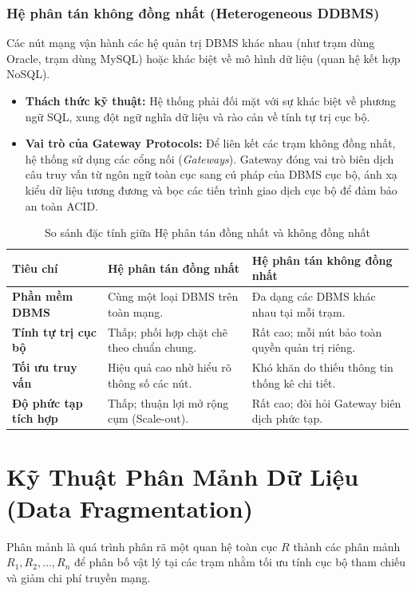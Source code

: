 \documentclass[12pt,a4paper]{report}
\begin{document}
\subsubsection{Hệ phân tán không đồng nhất (Heterogeneous DDBMS)}
Các nút mạng vận hành các hệ quản trị DBMS khác nhau (như trạm dùng Oracle, trạm dùng MySQL) hoặc khác biệt về mô hình dữ liệu (quan hệ kết hợp NoSQL).
\begin{itemize}[leftmargin=0.8cm, topsep=2pt, itemsep=1pt]
    \item \textbf{Thách thức kỹ thuật:} Hệ thống phải đối mặt với sự khác biệt về phương ngữ SQL, xung đột ngữ nghĩa dữ liệu và rào cản về tính tự trị cục bộ.
    \item \textbf{Vai trò của Gateway Protocols:} Để liên kết các trạm không đồng nhất, hệ thống sử dụng các cổng nối (\textit{Gateways}). Gateway đóng vai trò biên dịch câu truy vấn từ ngôn ngữ toàn cục sang cú pháp của DBMS cục bộ, ánh xạ kiểu dữ liệu tương đương và bọc các tiến trình giao dịch cục bộ để đảm bảo an toàn ACID.
\end{itemize}

\vspace{0.2cm}
\begin{table}[!ht]
\centering
\small
\caption{So sánh đặc tính giữa Hệ phân tán đồng nhất và không đồng nhất}
\label{tab:so_sanh_dong_nhat_khong_dong_nhat}
\renewcommand{\arraystretch}{1.25}
\begin{tabularx}{\textwidth}{|l|>{\raggedright\arraybackslash}X|>{\raggedright\arraybackslash}X|}
\hline
\textbf{Tiêu chí} & \textbf{Hệ phân tán đồng nhất} & \textbf{Hệ phân tán không đồng nhất} \\ \hline
\textbf{Phần mềm DBMS} & Cùng một loại DBMS trên toàn mạng. & Đa dạng các DBMS khác nhau tại mỗi trạm. \\ \hline
\textbf{Tính tự trị cục bộ} & Thấp; phối hợp chặt chẽ theo chuẩn chung. & Rất cao; mỗi nút bảo toàn quyền quản trị riêng. \\ \hline
\textbf{Tối ưu truy vấn} & Hiệu quả cao nhờ hiểu rõ thông số các nút. & Khó khăn do thiếu thông tin thống kê chi tiết. \\ \hline
\textbf{Độ phức tạp tích hợp} & Thấp; thuận lợi mở rộng cụm (Scale-out). & Rất cao; đòi hỏi Gateway biên dịch phức tạp. \\ \hline
\end{tabularx}
\end{table}

\section{Kỹ Thuật Phân Mảnh Dữ Liệu (Data Fragmentation)}
Phân mảnh là quá trình phân rã một quan hệ toàn cục $R$ thành các phân mảnh $R_1, R_2, \dots, R_n$ để phân bố vật lý tại các trạm nhằm tối ưu tính cục bộ tham chiếu và giảm chi phí truyền mạng.
\end{document}
